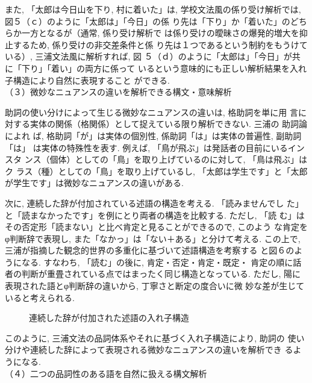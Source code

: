 また, 「太郎は今日山を下り, 村に着いた」は, 
学校文法風の係り受け解析では, 図５（ｃ）のように「太郎は」「今日」の係
り先は「下り」か「着いた」のどちらか一方となるが（通常, 係り受け解析で
は係り受けの曖昧さの爆発的増大を抑止するため, 係り受けの非交差条件と係
り先は１つであるという制約をもうけている）, 三浦文法風に解析すれば, 図
５（ｄ）のように「太郎は」「今日」が共に「下り」「着い」の両方に係って
いるという意味的にも正しい解析結果を入れ子構造により自然に表現すること
ができる. \\
（３）微妙なニュアンスの違いを解析できる構文・意味解析

助詞の使い分けによって生じる微妙なニュアンスの違いは, 格助詞を単に用
言に対する実体の関係（格関係）として捉えている限り解析できない. 三浦の
助詞論\cite{Miura1967a,Miura1967b,Miura1972,Miura1975,Miura1976}によれ
ば, 格助詞「が」は実体の個別性, 係助詞「は」は実体の普遍性, 副助詞「は」
は実体の特殊性を表す. 例えば, 「鳥が飛ぶ」は発話者の目前にいるインスタ
ンス（個体）としての「鳥」を取り上げているのに対して, 「鳥は飛ぶ」はク
ラス（種）としての「鳥」を取り上げているし, 「太郎は学生です」と「太郎
が学生です」は微妙なニュアンスの違いがある\cite{Miyazaki1993}.

 次に, 連続した辞が付加されている述語の構造を考える. 「読みませんでし
た」と「読まなかったです」を例にとり両者の構造を比較する. ただし, 「読
む」はその否定形「読まない」と比べ肯定と見ることができるので, このよう
な肯定をφ判断辞で表現し, また「なかっ」は「ない＋ある」と分けて考える. 
この上で, 三浦が指摘した観念的世界の多重化に基づいて述語構造を考察する
と図６のようになる. すなわち, 「読む」の後に, 肯定・否定・肯定・既定・
肯定の順に話者の判断が重畳されている点ではまったく同じ構造となっている. 
ただし, 陽に表現された語とφ判断辞の違いから, 丁寧さと断定の度合いに微
妙な差が生じていると考えられる.
\begin{figure}
\begin{center}
	
	
	
\end{center}

\caption{連続した辞が付加された述語の入れ子構造}
\label{fig:jutsugo}

\end{figure}

 このように, 三浦文法の品詞体系やそれに基づく入れ子構造により, 助詞の
使い分けや連続した辞によって表現される微妙なニュアンスの違いを解析でき
るようになる. \\
（４）二つの品詞性のある語を自然に扱える構文解析

